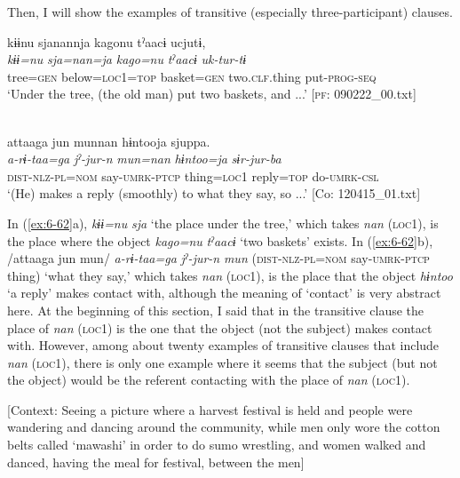 Then, I will show the examples of transitive (especially three-participant) clauses.

\ea\label{ex:6-62}
\ea
{\TM}
\glll kɨɨnu  sjanannja  kagonu  tˀaacɨ  ucjutɨ,\\
\textit{kɨɨ=nu}  \textit{sja=nan=ja}  \textit{kago=nu}  \textit{tˀaacɨ}  \textit{uk-tur-tɨ}\\
tree=\textsc{gen}  below=\textsc{loc1}=\textsc{top}  basket=\textsc{gen}  two.\textsc{clf}.thing  put-\textsc{prog}-\textsc{seq}\\
\glt ‘Under the tree, (the old man) put two baskets, and ...’ [\textsc{pf}: 090222\_00.txt]

\ex{}\\
{\TM}
\glll  attaaga  jun  munnan  hɨntooja     sjuppa.\\
\textit{a-rɨ-taa=ga}  \textit{jˀ-jur-n}  \textit{mun=nan}  \textit{hɨntoo=ja} \textit{sɨr-jur-ba}\\
\textsc{dist}-\textsc{nlz}-\textsc{pl}=\textsc{nom}  say-\textsc{umrk}-\textsc{ptcp}  thing=\textsc{loc1}  reply=\textsc{top}   do-\textsc{umrk}-\textsc{csl}\\
\glt ‘(He) makes a reply (smoothly) to what they say, so ...’ [Co: 120415\_01.txt]
\z
\z

In (\ref{ex:6-62}a), \textit{kɨɨ=nu} \textit{sja} ‘the place under the tree,’ which takes \textit{nan} (\textsc{loc1}), is the place where the object \textit{kago=nu} \textit{tˀaacɨ} ‘two baskets’ exists. In (\ref{ex:6-62}b), /attaaga jun mun/ \textit{a-rɨ-taa=ga} \textit{jˀ-jur-n} \textit{mun} (\textsc{dist}-\textsc{nlz}-\textsc{pl}=\textsc{nom} say-\textsc{umrk}-\textsc{ptcp} thing) ‘what they say,’ which takes \textit{nan} (\textsc{loc1}), is the place that the object \textit{hɨntoo} ‘a reply’ makes contact with, although the meaning of ‘contact’ is very abstract here. At the beginning of this section, I said that in the transitive clause the place of \textit{nan} (\textsc{loc1}) is the one that the object (not the subject) makes contact with. However, among about twenty examples of transitive clauses that include \textit{nan} (\textsc{loc1}), there is only one example where it seems that the subject (but not the object) would be the referent contacting with the place of \textit{nan} (\textsc{loc1}).

\ea\label{ex:6-63}
 [Context: Seeing a picture where a harvest festival is held and people were wandering and dancing around the community, while men only wore the cotton belts called ‘mawashi’ in order to do sumo wrestling, and women walked and danced, having the meal for festival, between the men]\\

